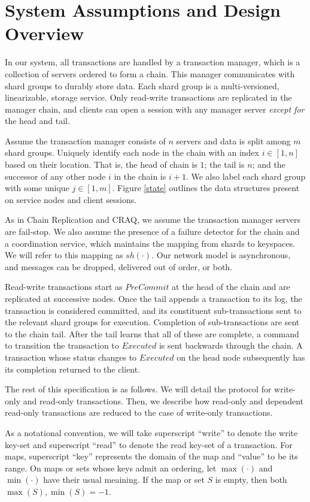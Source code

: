 \documentclass{article}
\begin{document}
\section{System Assumptions and Design Overview}
\par In our system, all transactions are handled by a transaction manager, which is a collection of servers ordered to form a chain. This manager communicates with shard groups to durably store data. Each shard group is a multi-versioned, linearizable, storage service. Only read-write transactions are replicated in the manager chain, and clients can open a session with any manager server \textit{except for} the head and tail. 
\par Assume the transaction manager consists of $n$ servers and data is split among $m$ shard groups. Uniquely identify each node in the chain with an index $i \in [1,n]$ based on their location. That is, the head of chain is $1$; the tail is $n$; and the successor of any other node $i$ in the chain is $i+1$. We also label each shard group with some unique $j \in [1, m]$. Figure \ref{state} outlines the data structures present on service nodes and client sessions. 
\par As in Chain Replication and CRAQ, we assume the transaction manager servers are fail-stop. We also assume the presence of a failure detector for the chain and a coordination service, which maintains the mapping from shards to keyspaces. We will refer to this mapping as $sh(\cdot)$. Our network model is asynchronous, and messages can be dropped, delivered out of order, or both. 
\par Read-write transactions start as $PreCommit$ at the head of the chain and are replicated at successive nodes. Once the tail appends a transaction to its log, the transaction is considered committed, and its constituent sub-transactions sent to the relevant shard groups for execution. Completion of sub-transactions are sent to the chain tail. After the tail learns that all of these are complete, a command to transition the transaction to $Executed$ is sent backwards through the chain. A transaction whose status changes to $Executed$ on the head node subsequently has its completion returned to the client.
\par The rest of this specification is as follows. We will detail the protocol for write-only and read-only transactions. Then, we describe how read-only and dependent read-only transactions are reduced to the case of write-only transactions. 
\par As a notational convention, we will take superscript ``write'' to denote the write key-set and superscript ``read'' to denote the read key-set of a transaction. For maps, superscript ``key'' represents the domain of the map and ``value'' to be its range. On maps or sets whose keys admit an ordering, let $\max(\cdot)$ and $\min(\cdot)$ have their usual meaining. If the map or set $S$ is empty, then both $\max(S), \min(S) = -1$. 
\end{document}
